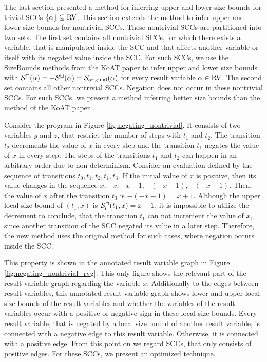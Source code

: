 The last section presented a method for inferring upper and lower size bounds for trivial SCCs $\lbrace \alpha \rbrace \subseteq \text{RV}$.
This section extends the method to infer upper and lower size bounds for nontrivial SCCs.
These nontrivial SCCs are partitioned into two sets.
The first set contains all nontrivial SCCs, for which there exists a variable, that is manipulated inside the SCC and that affects another variable or itself with its negated value inside the SCC.
For such SCCs, we use the SizeBounds methods from the KoAT paper \cite{koat} to infer upper and lower size bounds with ${\mathcal{S}^\sqcap}(\alpha) = -{\mathcal{S}^\sqcup}(\alpha) = \mathcal{S}_{\text{original}}(\alpha)$ for every result variable $\alpha \in \text{RV}$.
The second set contains all other nontrivial SCCs.
Negation does not occur in these nontrivial SCCs.
For such SCCs, we present a method inferring better size bounds than the method of the KoAT paper \cite{koat}.

\begin{example}
  
  Consider the program in Figure \ref{fig:negating_nontrivial}.
  It consists of two variables $y$ and $z$, that restrict the number of steps with $t_1$ and $t_2$.
  The transition $t_2$ decrements the value of $x$ in every step and the transition $t_1$ negates the value of $x$ in every step.
  The steps of the transitions $t_1$ and $t_2$ can happen in an arbitrary order due to non-determinism.
  Consider an evaluation defined by the sequence of transitions $t_0, t_1, t_2, t_1, t_3$.
  If the initial value of $x$ is positive, then its value changes in the sequence $x, -x, -x-1, -(-x-1), -(-x-1)$.
  Then, the value of $x$ after the transition $t_3$ is $-(-x-1) = x+1$.
  Although the upper local size bound of $(t_1,x)$ is ${\mathcal{S}^\sqcap_l}(t_1,x) = x-1$, it is impossible to utilize the decrement to conclude, that the transition $t_1$ can not increment the value of $x$, since another transition of the SCC negated its value in a later step.
  Therefore, the new method uses the original method for such cases, where negation occurs inside the SCC.
\end{example}



This property is shown in the annotated result variable graph in Figure \ref{fig:negating_nontrivial_rvg}.
This only figure shows the relevant part of the result variable graph regarding the variable $x$.
Additionally to the edges between result variables, this annotated result variable graph shows lower and upper local size bounds of the result variables and whether the variables of the result variables occur with a positive or negative sign in these local size bounds.
Every result variable, that is negated by a local size bound of another result variable, is connected with a negative edge to this result variable.
Otherwise, it is connected with a positive edge.
From this point on we regard SCCs, that only consists of positive edges.
For these SCCs, we present an optimized technique.


